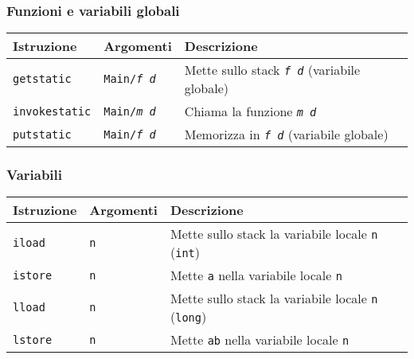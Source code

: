 \subsubsection*{Funzioni e variabili globali}
\label{sec:funzioni_e_varibili_globali}
{\footnotesize
\begin{longtable}{p{2cm} p{2cm} p{6.5cm}}
\toprule
\rowcolor[gray]{0.9}
  \textbf{Istruzione} &
  \textbf{Argomenti} &
  \textbf{Descrizione} \\
\toprule
\endhead
  \texttt{getstatic} &
  \texttt{Main/\textit{f} \textit{d}} &
  Mette sullo stack \texttt{\textit{f d}} (variabile globale) \\

  \texttt{invokestatic} &
  \texttt{Main/\textit{m} \textit{d}} &
  Chiama la funzione \texttt{\textit{m d}} \\
  
  \texttt{putstatic} &
  \texttt{Main/\textit{f} \textit{d}} &
  Memorizza in \texttt{\textit{f d}} (variabile globale) \\
\bottomrule
\end{longtable}
} %

\subsubsection*{Variabili}
\label{sec:variabili}
{\footnotesize
\begin{longtable}{p{2cm} p{2cm} p{6.5cm}}
\toprule
\rowcolor[gray]{0.9}
  \textbf{Istruzione} &
  \textbf{Argomenti} &
  \textbf{Descrizione} \\
\toprule
\endhead
  \texttt{iload} &
  \texttt{n} &
  Mette sullo stack la variabile locale \texttt{n} (\texttt{int}) \\

  \texttt{istore} &
  \texttt{n} &
  Mette \texttt{a} nella variabile locale \texttt{n}\\
  
  \texttt{lload} &
  \texttt{n} &
  Mette sullo stack la variabile locale \texttt{n} (\texttt{long}) \\
  
  \texttt{lstore} &
  \texttt{n} &
  Mette \texttt{ab} nella variabile locale \texttt{n}\\
\bottomrule
\end{longtable}
} %


